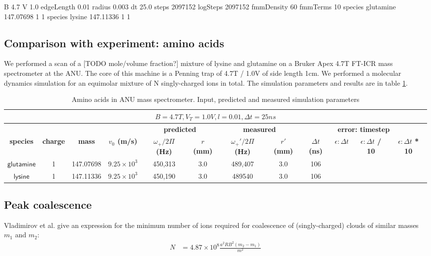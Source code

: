 \documentclass[10pt,conference,onecolumn]{IEEEtran}
\begin{document}
B 4.7
V 1.0
edgeLength 0.01
radius 0.003
dt 25.0
steps 2097152
logSteps 2097152
fmmDensity 60
fmmTerms 10
species glutamine 147.07698 1 1
species lysine 147.11336 1 1

\subsection{Comparison with experiment: amino acids}
\label{sec:amino}

We performed a scan of a [TODO mole/volume fraction?] mixture of lysine and glutamine on a Bruker Apex 4.7T FT-ICR mass spectrometer at the ANU.
The core of this machine is a Penning trap of 4.7T / 1.0V of side length 1cm.
We performed a molecular dynamics simulation for an equimolar mixture of N singly-charged ions in total.
The simulation parameters and results are in table \ref{tab:amino}.

\begin{table}[htbp]
 \centering	  	  
 \caption{Amino acids in ANU mass spectrometer. Input, predicted and measured simulation parameters}
\label{tab:amino}
\begin{tabular}{c|c|c|c|c|c|c|c|c|c|c|c}
 \hline \hline
  \multicolumn{12}{|c|}{$B = 4.7 T, V_T = 1.0 V, l = 0.01, \Delta t = 25ns$} \\
 \hline \hline
 \multicolumn{4}{|c|}{ } & \multicolumn{2}{|c|}{\textbf{predicted}} & \multicolumn{2}{|c|}{\textbf{measured}} & \multicolumn{4}{|c|}{\textbf{error: timestep}} \\ 
 \hline
 \textbf{species} & \textbf{charge} & \textbf{mass} & \textbf{$v_0$ (m/s)} & \textbf{$\omega_+ / 2\Pi$ (Hz)} & \textbf{$r$ (mm)} & \textbf{$\omega_+' / 2\Pi$ (Hz)}  & \textbf{$r'$ (mm)} & \textbf{$\Delta t$ (ns)} & \textbf{$\epsilon: \Delta t$}& \textbf{$\epsilon: \Delta t$ / 10} & \textbf{$\epsilon: \Delta t$ * 10}\\ 
 \hline
 $\mathsf{glutamine}$ & 1 & 147.07698 & $9.25 \times 10^3$ & 450,313 & 3.0 & 489,407 & 3.0 & 106 & \\
 $\mathsf{lysine}$ & 1 & 147.11336 & $9.25 \times 10^3$ & 450,190 & 3.0 & 489540 & 3.0 & 106 & \\
 \hline \hline
\end{tabular}
\end{table}

\subsection{Peak coalescence}

Vladimirov et al.\cite{Vladimirov2011} give an expression for the minimum number of ions required for coalescence of (singly-charged)  clouds of similar masses $m_1$ and $m_2$:
\begin{align}
N &= 4.87 \times 10^8 \frac{a^2 R B^2 (m_2 - m_1)}{m^2}
\end{align}
\end{document}
